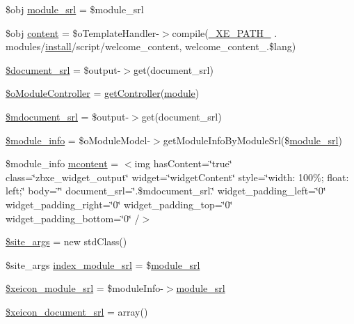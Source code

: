 \begin{DoxyCompactItemize}
\item 
\$obj \hyperlink{ko_8install_8php_a370bb6450fab1da3e0ed9f484a38b761}{module\+\_\+srl} = \$module\+\_\+srl
\item 
\$obj \hyperlink{ko_8install_8php_a65dddc3e5e47cb506e6b5417ffb3bdef}{content} = \$o\+Template\+Handler-\/$>$compile(\hyperlink{config_8inc_8php_a5387c7a3f2aa38adf16f324cee88db88}{\+\_\+\+X\+E\+\_\+\+P\+A\+T\+H\+\_\+} . \textquotesingle{}modules/\hyperlink{classinstall}{install}/script/welcome\+\_\+content\textquotesingle{}, \textquotesingle{}welcome\+\_\+content\+\_\+\textquotesingle{}.\$lang)
\item 
\hyperlink{ko_8install_8php_a14522e7fff0604a8372c75b4a0fbc0fd}{\$document\+\_\+srl} = \$output-\/$>$get(\textquotesingle{}document\+\_\+srl\textquotesingle{})
\item 
\hyperlink{ko_8install_8php_a9fd93f6625cec4fd65bf6f412e28c015}{\$o\+Module\+Controller} = \hyperlink{func_8inc_8php_aa08f01e3bf130d770b373ca8493e3e9b}{get\+Controller}(\textquotesingle{}\hyperlink{classmodule}{module}\textquotesingle{})
\item 
\hyperlink{ko_8install_8php_a27c211d9a984964f84c8ffb6ea7328fc}{\$mdocument\+\_\+srl} = \$output-\/$>$get(\textquotesingle{}document\+\_\+srl\textquotesingle{})
\item 
\hyperlink{ko_8install_8php_a5e701819149f6ea0893d4b79010417d3}{\$module\+\_\+info} = \$o\+Module\+Model-\/$>$get\+Module\+Info\+By\+Module\+Srl(\$\hyperlink{ko_8install_8php_a370bb6450fab1da3e0ed9f484a38b761}{module\+\_\+srl})
\item 
\$module\+\_\+info \hyperlink{ko_8install_8php_a9da4bb6e77356bb68ae0e05dbd9f5e2f}{mcontent} = \textquotesingle{}$<$img has\+Content=\char`\"{}true\char`\"{} class=\char`\"{}zbxe\+\_\+widget\+\_\+output\char`\"{} widget=\char`\"{}widget\+Content\char`\"{} style=\char`\"{}width\+: 100\%; float\+: left;\char`\"{} body=\char`\"{}\char`\"{} document\+\_\+srl=\char`\"{}\textquotesingle{}.\$mdocument\+\_\+srl.\textquotesingle{}\char`\"{} widget\+\_\+padding\+\_\+left=\char`\"{}0\char`\"{} widget\+\_\+padding\+\_\+right=\char`\"{}0\char`\"{} widget\+\_\+padding\+\_\+top=\char`\"{}0\char`\"{} widget\+\_\+padding\+\_\+bottom=\char`\"{}0\char`\"{} /$>$\textquotesingle{}
\item 
\hyperlink{ko_8install_8php_a19e0fcfacd69155c9cc255e5500f6ccc}{\$site\+\_\+args} = new std\+Class()
\item 
\$site\+\_\+args \hyperlink{ko_8install_8php_acd0b17bfe6d14c82871d73fa39c9c22d}{index\+\_\+module\+\_\+srl} = \$\hyperlink{ko_8install_8php_a370bb6450fab1da3e0ed9f484a38b761}{module\+\_\+srl}
\item 
\hyperlink{ko_8install_8php_acf278a9931e1d1ea52b045c0fa42b9b3}{\$xeicon\+\_\+module\+\_\+srl} = \$module\+Info-\/$>$\hyperlink{ko_8install_8php_a370bb6450fab1da3e0ed9f484a38b761}{module\+\_\+srl}
\item 
\hyperlink{ko_8install_8php_a41d95a71ebf0758e83224ab4bb3a31c0}{\$xeicon\+\_\+document\+\_\+srl} = array()
\end{DoxyCompactItemize}


